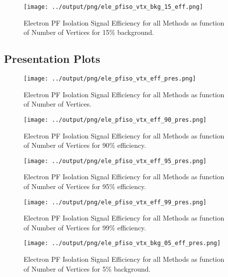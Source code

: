 \documentclass[11pt]{book}
\begin{document}
\begin{figure}[htb]
\centering
\texttt{[image: ../output/png/ele\_pfiso\_vtx\_bkg\_15\_eff.png]}
\caption{Electron PF Isolation Signal Efficiency for all Methods as function of Number of Vertices for 15\% background.}
\label{fig:ele_pfiso_vtx_bkg_15_eff}
\end{figure}
\clearpage

\subsection{Presentation Plots}
\begin{figure}[htb]
\centering
\texttt{[image: ../output/png/ele\_pfiso\_vtx\_eff\_pres.png]}
\caption{Electron PF Isolation Signal Efficiency for all Methods as function of Number of Vertices.}
\label{fig:ele_pfiso_vtx_eff_pres}
\end{figure}

\begin{figure}[htb]
\centering
\texttt{[image: ../output/png/ele\_pfiso\_vtx\_eff\_90\_pres.png]}
\caption{Electron PF Isolation Signal Efficiency for all Methods as function of Number of Vertices for 90\% efficiency.}
\label{fig:ele_pfiso_vtx_eff_90_pres}
\end{figure}

\begin{figure}[htb]
\centering
\texttt{[image: ../output/png/ele\_pfiso\_vtx\_eff\_95\_pres.png]}
\caption{Electron PF Isolation Signal Efficiency for all Methods as function of Number of Vertices for 95\% efficiency.}
\label{fig:ele_pfiso_vtx_eff_95_pres}
\end{figure}

\begin{figure}[htb]
\centering
\texttt{[image: ../output/png/ele\_pfiso\_vtx\_eff\_99\_pres.png]}
\caption{Electron PF Isolation Signal Efficiency for all Methods as function of Number of Vertices for 99\% efficiency.}
\label{fig:ele_pfiso_vtx_eff_99_pres}
\end{figure}

\begin{figure}[htb]
\centering
\texttt{[image: ../output/png/ele\_pfiso\_vtx\_bkg\_05\_eff\_pres.png]}
\caption{Electron PF Isolation Signal Efficiency for all Methods as function of Number of Vertices for 5\% background.}
\label{fig:ele_pfiso_vtx_bkg_05_eff_pres}
\end{figure}
\end{document}
